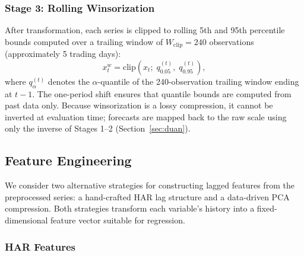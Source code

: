 \subsubsection{Stage 3: Rolling Winsorization}
\label{sec:winsorization}

After transformation, each series is clipped to rolling 5th and 95th percentile bounds computed over a trailing window of $W_{\mathrm{clip}} = 240$ observations (approximately 5 trading days):
\begin{equation}
    x_t^{w} = \mathrm{clip}\!\left(x_t;\; q_{0.05}^{(t)},\; q_{0.95}^{(t)}\right),
    \label{eq:winsor}
\end{equation}
where $q_{\alpha}^{(t)}$ denotes the $\alpha$-quantile of the 240-observation trailing window ending at $t-1$. The one-period shift ensures that quantile bounds are computed from past data only. Because winsorization is a lossy compression, it cannot be inverted at evaluation time; forecasts are mapped back to the raw scale using only the inverse of Stages 1--2 (Section~\ref{sec:duan}).

\subsection{Feature Engineering}
\label{sec:features}

We consider two alternative strategies for constructing lagged features from the preprocessed series: a hand-crafted HAR lag structure and a data-driven PCA compression. Both strategies transform each variable's history into a fixed-dimensional feature vector suitable for regression.

\subsubsection{HAR Features}
\label{sec:har_features}

